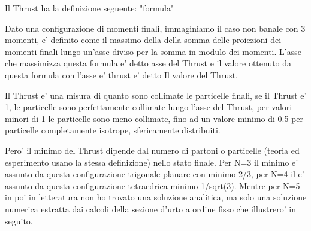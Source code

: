 \documentclass{article}
\begin{document}
    Il Thrust ha la definizione seguente: "formula"

    Dato una configurazione di momenti finali, immaginiamo il caso non banale con 3 momenti, e' definito come il massimo della della somma delle proiezioni dei momenti finali lungo un'asse diviso 
    per la somma in modulo dei momenti. L'asse che massimizza questa formula e' detto asse del Thrust e il valore ottenuto da questa formula con l'asse e' thrust e' detto Il
    valore del Thrust.
    
    Il Thrust e' una misura di quanto sono collimate le particelle finali, se il Thrust e' 1, le particelle sono perfettamente collimate lungo l'asse del Thrust, per valori minori di 1 le particelle sono meno collimate, fino 
    ad un valore minimo di 0.5 per particelle completamente isotrope, sfericamente distribuiti.

    Pero' il minimo del Thrust dipende dal numero di partoni o particelle (teoria ed esperimento usano la stessa definizione) 
    nello stato finale. Per N=3 il minimo e' assunto da questa configurazione trigonale planare con minimo 2/3, per N=4 il e' assunto 
    da questa configurazione tetraedrica minimo 1/sqrt(3). Mentre per N=5 in poi in letteratura non ho 
    trovato una soluzione analitica, ma solo una soluzione numerica estratta dai calcoli della sezione d'urto
    a ordine fisso che illustrero' in seguito.  
\end{document}
